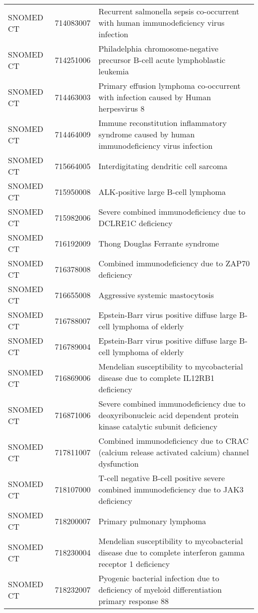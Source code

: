 \begin{longtable}{p{}p{}p{}}
  SNOMED CT & 714083007 & Recurrent salmonella sepsis co-occurrent with human immunodeficiency virus infection \\ 
  SNOMED CT & 714251006 & Philadelphia chromosome-negative precursor B-cell acute lymphoblastic leukemia \\ 
  SNOMED CT & 714463003 & Primary effusion lymphoma co-occurrent with infection caused by Human herpesvirus 8 \\ 
  SNOMED CT & 714464009 & Immune reconstitution inflammatory syndrome caused by human immunodeficiency virus infection \\ 
  SNOMED CT & 715664005 & Interdigitating dendritic cell sarcoma \\ 
  SNOMED CT & 715950008 & ALK-positive large B-cell lymphoma \\ 
  SNOMED CT & 715982006 & Severe combined immunodeficiency due to DCLRE1C deficiency \\ 
  SNOMED CT & 716192009 & Thong Douglas Ferrante syndrome \\ 
  SNOMED CT & 716378008 & Combined immunodeficiency due to ZAP70 deficiency \\ 
  SNOMED CT & 716655008 & Aggressive systemic mastocytosis \\ 
  SNOMED CT & 716788007 & Epstein-Barr virus positive diffuse large B-cell lymphoma of elderly \\ 
  SNOMED CT & 716789004 & Epstein-Barr virus positive diffuse large B-cell lymphoma of elderly \\ 
  SNOMED CT & 716869006 & Mendelian susceptibility to mycobacterial disease due to complete IL12RB1 deficiency \\ 
  SNOMED CT & 716871006 & Severe combined immunodeficiency due to deoxyribonucleic acid dependent protein kinase catalytic subunit deficiency \\ 
  SNOMED CT & 717811007 & Combined immunodeficiency due to CRAC (calcium release activated calcium) channel dysfunction \\ 
  SNOMED CT & 718107000 & T-cell negative B-cell positive severe combined immunodeficiency due to JAK3 deficiency \\ 
  SNOMED CT & 718200007 & Primary pulmonary lymphoma \\ 
  SNOMED CT & 718230004 & Mendelian susceptibility to mycobacterial disease due to complete interferon gamma receptor 1 deficiency \\ 
  SNOMED CT & 718232007 & Pyogenic bacterial infection due to deficiency of myeloid differentiation primary response 88 \\ 

\end{longtable}

